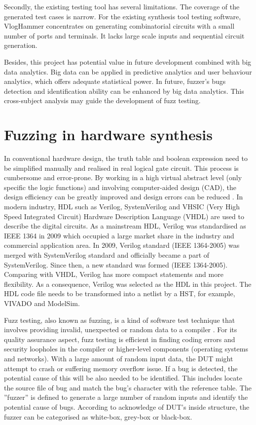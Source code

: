 Secondly, the existing testing tool has several limitations. The coverage of the generated test cases is narrow. For the existing synthesis tool testing software, VlogHammer \cite{wolf2016yosys} concentrates on generating combinatorial circuits with a small number of ports and terminals. It lacks large scale inputs and sequential circuit generation.

Besides, this project has potential value in future development combined with big data analytics. Big data can be applied in predictive analytics and user behaviour analytics, which offers adequate statistical power. In future, fuzzer's bugs detection and identification ability can be enhanced by big data analytics. This cross-subject analysis may guide the development of fuzz testing.

\section{Fuzzing in hardware synthesis}
In conventional hardware design, the truth table and boolean expression need to be simplified manually and realised in real logical gate circuit. This process is cumbersome and error-prone. By working in a high virtual abstract level (only specific the logic functions) and involving computer-aided design (CAD), the design efficiency can be greatly improved and design errors can be reduced \cite{harris2015digital}. In modern industry, HDL such as Verilog, SystemVerilog and VHSIC (Very High Speed Integrated Circuit) Hardware Description Language (VHDL) are used to describe the digital circuits. As a mainstream HDL, Verilog was standardised as IEEE 1364 in 2009 \cite{1620780} which occupied a large market share in the industry and commercial application area. In 2009, Verilog standard (IEEE 1364-2005) was merged with SystemVerilog standard and officially became a part of SystemVerilog. Since then, a new standard was formed (IEEE 1364-2005). Comparing with VHDL, Verilog has more compact statements and more flexibility. As a consequence, Verilog was selected as the HDL in this project. The HDL code file needs to be transformed into a netlist by a HST, for example, VIVADO and ModelSim.\label{ieeestandard}

Fuzz testing, also known as fuzzing, is a kind of software test technique that involves providing invalid, unexpected or random data to a compiler \cite{miller2007fuzz}. For its quality assurance aspect, fuzz testing is efficient in finding coding errors and security loopholes in the compiler or higher-level components (operating systems and networks). With a large amount of random input data, the DUT might attempt to crash or suffering memory overflow issue. If a bug is detected, the potential cause of this will be also needed to be identified. This includes locate the source file of bug and match the bug's character with the reference table. The ''fuzzer'' is defined to generate a large number of random inputs and identify the potential cause of bugs. According to acknowledge of DUT's inside structure, the fuzzer can be categorised as white-box, grey-box or black-box.

